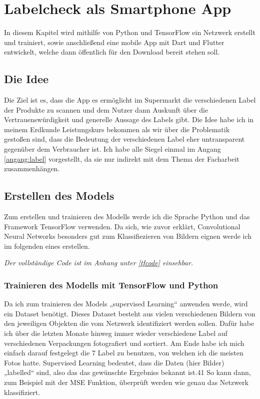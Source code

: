 \section{Labelcheck als Smartphone App}\label{labelcheck}

In diesem Kapitel wird mithilfe von Python und TensorFlow ein Netzwerk erstellt und trainiert, sowie anschließend eine mobile App mit Dart und Flutter entwickelt, welche dann öffentlich für den Download bereit stehen soll.

\subsection{Die Idee}

Die Ziel ist es, dass die App es ermöglicht im Supermarkt die verschiedenen Label der Produkte zu scannen und dem Nutzer dann Auskunft über die Vertrauenswürdigkeit und generelle Aussage des Labels gibt. Die Idee habe ich in meinem Erdkunde Leistungskurs bekommen als wir über die Problematik gestoßen sind, dass die Bedeutung der verschiedenen Label eher untransparent gegenüber dem Verbraucher ist. Ich habe alle Siegel einmal im Angang \ref{angang:label} vorgestellt, da sie nur indirekt mit dem Thema der Facharbeit zusammenhängen.

\subsection{Erstellen des Models}\label{erstellen des modells}

Zum erstellen und trainieren des Modells werde ich die Sprache Python und das
Framework TensorFlow verwenden. Da sich, wie zuvor erklärt, Convolutional Neural Networks besonders gut zum Klassifiezieren von Bildern eignen werde ich im folgenden eines erstellen. 

\emph{Der vollständige Code ist im Anhang unter \ref{tfcode} einsehbar.}

\subsubsection{Trainieren des Modells mit TensorFlow und Python}

Da ich zum trainieren des Models „supervised Learning“ anwenden werde, wird ein Dataset benötigt. Dieses Dataset besteht aus vielen verschiedenen Bildern von den jeweiligen Objekten die vom Netzwerk identifiziert werden sollen. Dafür habe ich über die letzten Monate hinweg immer wieder verschiedene Label auf verschiedenen Verpackungen fotografiert und sortiert. Am Ende habe ich mich einfach darauf festgelegt die 7 Label zu benutzen, von welchen ich die meisten Fotos hatte. Supervised Learning bedeutet, dass die Daten (hier Bilder) „labelled“ sind, also das das gewünschte Ergebniss bekannt ist.41 So kann dann, zum Beispiel mit der MSE Funktion, überprüft werden wie genau das Netzwerk klassifiziert.

